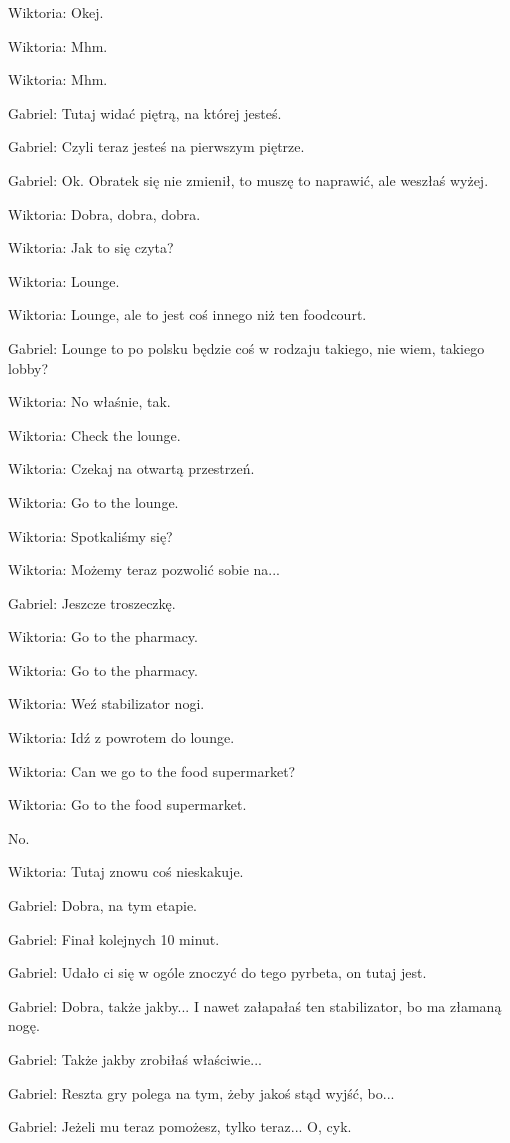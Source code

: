 Wiktoria: Okej.

Wiktoria: Mhm.

Wiktoria: Mhm.

Gabriel: Tutaj widać piętrą, na której jesteś.

Gabriel: Czyli teraz jesteś na pierwszym piętrze.

Gabriel: Ok. Obratek się nie zmienił, to muszę to naprawić, ale weszłaś wyżej.

Wiktoria: Dobra, dobra, dobra.

Wiktoria: Jak to się czyta?

Wiktoria: Lounge.

Wiktoria: Lounge, ale to jest coś innego niż ten foodcourt.

Gabriel: Lounge to po polsku będzie coś w rodzaju takiego, nie wiem, takiego lobby?

Wiktoria: No właśnie, tak.

Wiktoria: Check the lounge.

Wiktoria: Czekaj na otwartą przestrzeń.

Wiktoria: Go to the lounge.

Wiktoria: Spotkaliśmy się?

Wiktoria: Możemy teraz pozwolić sobie na...

Gabriel: Jeszcze troszeczkę.

Wiktoria: Go to the pharmacy.

Wiktoria: Go to the pharmacy.

Wiktoria: Weź stabilizator nogi.

Wiktoria: Idź z powrotem do lounge.

Wiktoria: Can we go to the food supermarket?

Wiktoria: Go to the food supermarket.

No.

Wiktoria: Tutaj znowu coś nieskakuje.

Gabriel: Dobra, na tym etapie.

Gabriel: Finał kolejnych 10 minut.

Gabriel: Udało ci się w ogóle znoczyć do tego pyrbeta, on tutaj jest.

Gabriel: Dobra, także jakby... I nawet załapałaś ten stabilizator, bo ma złamaną nogę.

Gabriel: Także jakby zrobiłaś właściwie...

Gabriel: Reszta gry polega na tym, żeby jakoś stąd wyjść, bo...

Gabriel: Jeżeli mu teraz pomożesz, tylko teraz... O, cyk.

